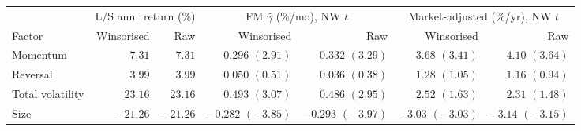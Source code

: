 \begin{tabular}{lrrrrrr}
\toprule
& \multicolumn{2}{c}{L/S ann.\ return (\%)} & \multicolumn{2}{c}{FM $\bar\gamma$ (\%/mo), NW $t$} & \multicolumn{2}{c}{Market-adjusted (\%/yr), NW $t$} \\
\cmidrule(lr){2-3} \cmidrule(lr){4-5} \cmidrule(lr){6-7}
Factor & Winsorised & Raw & Winsorised & Raw & Winsorised & Raw \\
\midrule
Momentum & $7.31$ & $7.31$ & $0.296$ $(2.91)$ & $0.332$ $(3.29)$ & $3.68$ $(3.41)$ & $4.10$ $(3.64)$ \\
Reversal & $3.99$ & $3.99$ & $0.050$ $(0.51)$ & $0.036$ $(0.38)$ & $1.28$ $(1.05)$ & $1.16$ $(0.94)$ \\
Total volatility & $23.16$ & $23.16$ & $0.493$ $(3.07)$ & $0.486$ $(2.95)$ & $2.52$ $(1.63)$ & $2.31$ $(1.48)$ \\
Size & $-21.26$ & $-21.26$ & $-0.282$ $(-3.85)$ & $-0.293$ $(-3.97)$ & $-3.03$ $(-3.03)$ & $-3.14$ $(-3.15)$ \\
\bottomrule
\end{tabular}
